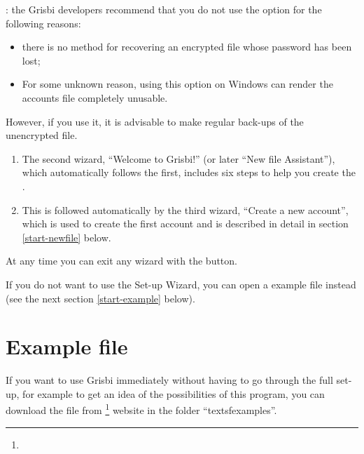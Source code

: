\Attention{}: the Grisbi developers recommend that you do not use the  option for the following reasons:
\begin{itemize}
	\item there is no method for recovering an encrypted file whose password has been lost;
	\item For some unknown reason, using this option on Windows can render the accounts file completely unusable.
\end{itemize} 
However, if you use it, it is advisable to make regular back-ups of the unencrypted file.

\begin{enumerate}[resume]		%
	\item The second wizard, \enquote{Welcome to Grisbi!} (or later \enquote{New file Assistant}), which automatically follows the first, includes six steps to help you create the .%
	\item This is followed automatically by the third wizard, \enquote{Create a new account}, which is used to create the first account and is described in detail in section \ref{start-newfile} below.%
\end{enumerate}

At any time you can exit any wizard with the  button.

If you do not want to use the Set-up Wizard, you can open a example file instead (see the next section \ref{start-example} below).



\section{Example file\label{start-example}}


If you want to use Grisbi immediately without having to go through the full set-up, for example to get an idea of the possibilities of this program, you can download the  file from \footnote{\urlSourceForgeDocumentation{}} website in the folder \enquote{textsf{examples}}.

